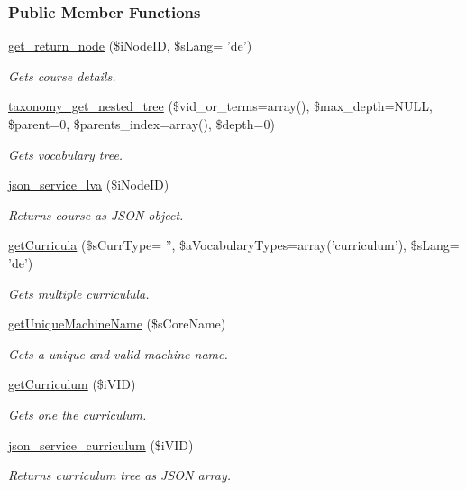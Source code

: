 \subsubsection*{Public Member Functions}
\begin{DoxyCompactItemize}
\item 
\hyperlink{classcontent__manager_a6732db58443e8a0948bcc7705f654c7a}{get\+\_\+return\+\_\+node} (\$i\+Node\+I\+D, \$s\+Lang= 'de')
\begin{DoxyCompactList}\small\item\em Gets course details. \end{DoxyCompactList}\item 
\hyperlink{classcontent__manager_acfeb4c387a22e750487e1bee5c73c1f9}{taxonomy\+\_\+get\+\_\+nested\+\_\+tree} (\$vid\+\_\+or\+\_\+terms=array(), \$max\+\_\+depth=N\+U\+L\+L, \$parent=0, \$parents\+\_\+index=array(), \$depth=0)
\begin{DoxyCompactList}\small\item\em Gets vocabulary tree. \end{DoxyCompactList}\item 
\hyperlink{classcontent__manager_a4f357170f7656cabf748245c46d7e8be}{json\+\_\+service\+\_\+lva} (\$i\+Node\+I\+D)
\begin{DoxyCompactList}\small\item\em Returns course as J\+S\+O\+N object. \end{DoxyCompactList}\item 
\hyperlink{classcontent__manager_a3c6667e24648fecc0ec3751318ac55bd}{get\+Curricula} (\$s\+Curr\+Type= '', \$a\+Vocabulary\+Types=array('curriculum'), \$s\+Lang= 'de')
\begin{DoxyCompactList}\small\item\em Gets multiple curriculula. \end{DoxyCompactList}\item 
\hyperlink{classcontent__manager_a5d110b5c929715c771e2d903951ef7ca}{get\+Unique\+Machine\+Name} (\$s\+Core\+Name)
\begin{DoxyCompactList}\small\item\em Gets a unique and valid machine name. \end{DoxyCompactList}\item 
\hyperlink{classcontent__manager_a0fccc30120c83ecc35b6a84b4654f2dc}{get\+Curriculum} (\$i\+V\+I\+D)
\begin{DoxyCompactList}\small\item\em Gets one the curriculum. \end{DoxyCompactList}\item 
\hyperlink{classcontent__manager_abe8407588c7195d203e7df5ff53fb373}{json\+\_\+service\+\_\+curriculum} (\$i\+V\+I\+D)
\begin{DoxyCompactList}\small\item\em Returns curriculum tree as J\+S\+O\+N array. \end{DoxyCompactList}\end{DoxyCompactItemize}


